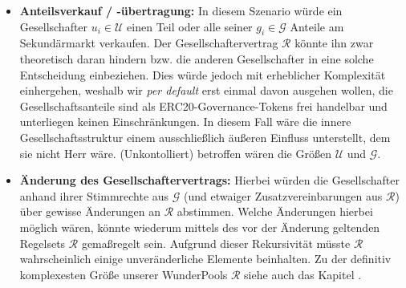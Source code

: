 \begin{Fazit}
\begin{itemize}
\begin{itemize}
  \end{itemize}
  \item \textbf{Anteilsverkauf / -übertragung:} In diesem Szenario würde ein Gesellschafter $u_{i} \in \mathcal{U}$ einen Teil oder alle seiner $g_{i} \in \mathcal{G}$ Anteile am Sekundärmarkt verkaufen. Der Gesellschaftervertrag $\mathcal{R}$ könnte ihn zwar theoretisch daran hindern bzw. die anderen Gesellschafter in eine solche Entscheidung einbeziehen. Dies würde jedoch mit erheblicher Komplexität einhergehen, weshalb wir \textit{per default} erst einmal davon ausgehen wollen, die Gesellschaftsanteile sind als ERC20-Gover\-nance-Tokens frei handelbar und unterliegen keinen Einschränkungen. In diesem Fall wäre die innere Gesellschaftsstruktur einem ausschließlich äußeren Einfluss unterstellt, dem sie nicht Herr wäre. (Unkontolliert) betroffen wären die Größen $\mathcal{U}$ und $\mathcal{G}$.
  \item \textbf{Änderung des Gesellschaftervertrags:} Hierbei würden die Gesellschafter anhand ihrer Stimmrechte aus $\mathcal{G}$ (und etwaiger Zusatzvereinbarungen aus $\mathcal{R}$) über gewisse Änderungen an $\mathcal{R}$ abstimmen. Welche Änderungen hierbei möglich wären, könnte wiederum mittels des vor der Änderung geltenden Regelsets $\mathcal{R}$ gemaßregelt sein. Aufgrund dieser Rekursivität müsste $\mathcal{R}$ wahr\-scheinlich einige unveränderliche Elemente beinhalten. Zu der definitiv komplexesten Größe unserer WunderPools $\mathcal{R}$ siehe auch das Kapitel .
\end{itemize}

\end{Fazit}

\vspace{0.5cm}